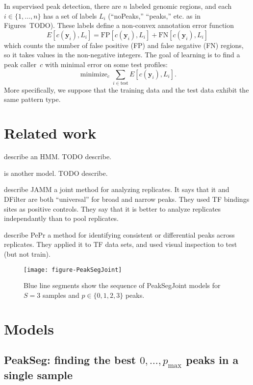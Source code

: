 \documentclass{article} %
\DeclareMathOperator*{\minimize}{minimize}
\begin{document}
In supervised peak detection, there are $n$ labeled genomic regions,
and each $i\in\{1, \dots, n\}$ has a set of labels $L_i$ (``noPeaks,''
``peaks,'' etc. as in Figures~TODO). These labels define a non-convex
annotation error function
\begin{equation}
  \label{eq:error}
  E[c(\mathbf y_i),  L_i] =
  \text{FP}[c(\mathbf y_i), L_i] +
  \text{FN}[c(\mathbf y_i), L_i]
\end{equation}
which counts the number of false positive (FP) and false negative (FN)
regions, so it takes values in the non-negative integers. The goal of
learning is to find a peak caller~$c$ with minimal error on some test
profiles:
\begin{equation}
  \label{eq:min_error}
  \minimize_c \sum_{i\in\text{test}} E[c(\mathbf y_i),  L_i].
\end{equation}
More specifically, we suppose that the training data and the test data
exhibit the same pattern type.
\section{Related work}

\citet{hierarchical-joint} describe an HMM. TODO describe.

\citet{jmosaics} is another model. TODO describe.

\citet{JAMM} describe JAMM a joint method for analyzing replicates. It
says that it and DFilter are both ``universal'' for broad and narrow
peaks. They used TF bindings sites as positive controls. They say that
it is better to analyze replicates independantly than to pool
replicates.

\citet{PePr} describe PePr a method for identifying consistent or
differential peaks across replicates. They applied it to TF data sets,
and used visual inspection to test (but not train).

\begin{figure}[b!]
  \centering
  \texttt{[image: figure-PeakSegJoint]}
  \caption{Blue line segments show the sequence of PeakSegJoint models
    for $S=3$ samples and $p\in\{0, 1, 2, 3\}$ peaks.}
  \label{fig:PeakSegJoint}
\end{figure}

\section{Models}

\subsection{PeakSeg: finding the best $0,\dots,p_{\text{max}}$ peaks
  in a single sample}
\end{document}
